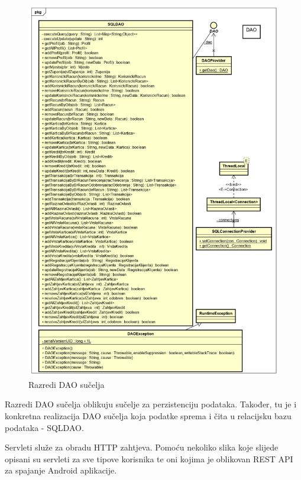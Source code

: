 			\begin{figure}[H]
				\includegraphics[scale=0.54]{Slike/Class Diagram5.PNG}
				\centering
				\caption{Razredi DAO sučelja}
				\label{fig:dijagram}
			\end{figure}
		
		Razredi DAO sučelja oblikuju sučelje za perzistenciju podataka. Također, tu je i konkretna realizacija DAO sučelja koja podatke sprema i čita u relacijsku bazu podataka - SQLDAO.	\newline \newline
		
		Servleti služe za obradu HTTP zahtjeva. Pomoću nekoliko slika koje slijede opisani su servleti za sve tipove korisnika te oni kojima je oblikovan REST API za spajanje Android aplikacije.
		
